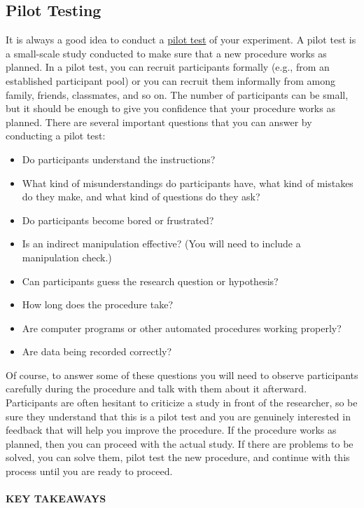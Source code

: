\documentclass[
]{krantz}
\providecommand{\tightlist}{%
  \setlength{\itemsep}{0pt}\setlength{\parskip}{0pt}}
\begin{document}
\subsection*{Pilot Testing}\label{pilot-testing}


It is always a good idea to conduct a \hyperref[pilot-test]{pilot test} of your experiment. A pilot test is a small-scale study conducted to make sure that a new procedure works as planned. In a pilot test, you can recruit participants formally (e.g., from an established participant pool) or you can recruit them informally from among family, friends, classmates, and so on. The number of participants can be small, but it should be enough to give you confidence that your procedure works as planned. There are several important questions that you can answer by conducting a pilot test:

\begin{itemize}
\tightlist
\item
  Do participants understand the instructions?
\item
  What kind of misunderstandings do participants have, what kind of mistakes do they make, and what kind of questions do they ask?
\item
  Do participants become bored or frustrated?
\item
  Is an indirect manipulation effective? (You will need to include a manipulation check.)
\item
  Can participants guess the research question or hypothesis?
\item
  How long does the procedure take?
\item
  Are computer programs or other automated procedures working properly?
\item
  Are data being recorded correctly?
\end{itemize}

Of course, to answer some of these questions you will need to observe participants carefully during the procedure and talk with them about it afterward. Participants are often hesitant to criticize a study in front of the researcher, so be sure they understand that this is a pilot test and you are genuinely interested in feedback that will help you improve the procedure. If the procedure works as planned, then you can proceed with the actual study. If there are problems to be solved, you can solve them, pilot test the new procedure, and continue with this process until you are ready to proceed.

\paragraph*{KEY TAKEAWAYS}\label{key-takeaways-8}
\end{document}
